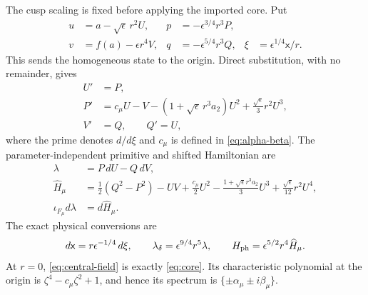 \documentclass[11pt,reqno]{amsart}
\numberwithin{equation}{section}
\theoremstyle{definition}
\theoremstyle{remark}
\begin{document}
The cusp scaling is fixed before applying the imported core.  Put
\begin{equation}\label{eq:central-change}
 \begin{aligned}
  u&=a-\sqrt\epsilon\,r^2U,&
  p&=-\epsilon^{3/4}r^3P,\\
  v&=f(a)-\epsilon r^4V,&
  q&=-\epsilon^{5/4}r^3Q,&
  \xi&=\epsilon^{1/4}\mathsf x/r.
 \end{aligned}
\end{equation}
This sends the homogeneous state to the origin.  Direct substitution, with no
remainder, gives
\begin{equation}\label{eq:central-field}
 \begin{aligned}
  U'&=P,\\
  P'&=c_\mu U-V-(1+\sqrt\epsilon\,r^3a_2)U^2
       +\frac{\sqrt\epsilon}{3}r^2U^3,\\
  V'&=Q,\qquad Q'=U,
 \end{aligned}
\end{equation}
where the prime denotes $d/d\xi$ and $c_\mu$ is defined in
\eqref{eq:alpha-beta}.  The parameter-independent primitive and shifted
Hamiltonian are
\begin{equation}\label{eq:central-H}
 \begin{aligned}
  \lambda&=P\,dU-Q\,dV,\\
  \widehat H_\mu
  &=\frac12(Q^2-P^2)-UV+\frac{c_\mu}{2}U^2
   -\frac{1+\sqrt\epsilon r^3a_2}{3}U^3
   +\frac{\sqrt\epsilon}{12}r^2U^4,\\
  \iota_{F_\mu}d\lambda&=d\widehat H_\mu.
 \end{aligned}
\end{equation}
The exact physical conversions are
\begin{equation}\label{eq:clock-action-scales}
 d\mathsf x=r\epsilon^{-1/4}\,d\xi,\qquad
 \lambda_\delta=\epsilon^{9/4}r^5\lambda,\qquad
 H_{\rm ph}=\epsilon^{5/2}r^4\widehat H_\mu.
\end{equation}
At $r=0$, \eqref{eq:central-field} is exactly \eqref{eq:core}.  Its
characteristic polynomial at the origin is
$\zeta^4-c_\mu\zeta^2+1$, and hence its spectrum is
$\{\pm\alpha_\mu\pm i\beta_\mu\}$.
\end{document}
